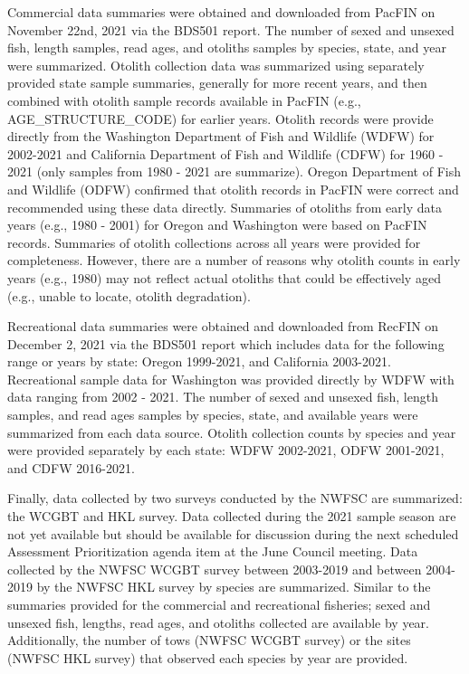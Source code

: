 \documentclass[11pt,
  english,
  letterpaper,
]{article}
\begin{document}
\leavevmode\tagmcend\tagstructend\par


Commercial data summaries were obtained and downloaded from PacFIN on November 22nd, 2021 via the BDS501 report. The number of sexed and unsexed fish, length samples, read ages, and otoliths samples by species, state, and year were summarized. Otolith collection data was summarized using separately provided state sample summaries, generally for more recent years, and then combined with otolith sample records available in PacFIN (e.g., AGE\_STRUCTURE\_CODE) for earlier years. Otolith records were provide directly from the Washington Department of Fish and Wildlife (WDFW) for 2002-2021 and California Department of Fish and Wildlife (CDFW) for 1960 - 2021 (only samples from 1980 - 2021 are summarize). Oregon Department of Fish and Wildlife (ODFW) confirmed that otolith records in PacFIN were correct and recommended using these data directly. Summaries of otoliths from early data years (e.g., 1980 - 2001) for Oregon and Washington were based on PacFIN records. Summaries of otolith collections across all years were provided for completeness. However, there are a number of reasons why otolith counts in early years (e.g., 1980) may not reflect actual otoliths that could be effectively aged (e.g., unable to locate, otolith degradation).

\leavevmode\tagmcend\tagstructend\par


Recreational data summaries were obtained and downloaded from RecFIN on December 2, 2021 via the BDS501 report which includes data for the following range or years by state: Oregon 1999-2021, and California 2003-2021. Recreational sample data for Washington was provided directly by WDFW with data ranging from 2002 - 2021. The number of sexed and unsexed fish, length samples, and read ages samples by species, state, and available years were summarized from each data source. Otolith collection counts by species and year were provided separately by each state: WDFW 2002-2021, ODFW 2001-2021, and CDFW 2016-2021.

\leavevmode\tagmcend\tagstructend\par


Finally, data collected by two surveys conducted by the NWFSC are summarized: the WCGBT and HKL survey. Data collected during the 2021 sample season are not yet available but should be available for discussion during the next scheduled Assessment Prioritization agenda item at the June Council meeting. Data collected by the NWFSC WCGBT survey between 2003-2019 and between 2004-2019 by the NWFSC HKL survey by species are summarized. Similar to the summaries provided for the commercial and recreational fisheries; sexed and unsexed fish, lengths, read ages, and otoliths collected are available by year. Additionally, the number of tows (NWFSC WCGBT survey) or the sites (NWFSC HKL survey) that observed each species by year are provided.
\end{document}
